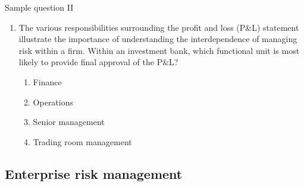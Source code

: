 \begin{frame}{Sample question II}

\begin{enumerate}
	\item The various responsibilities surrounding the profit and loss (P\&L) statement
	illustrate the importance of understanding the interdependence of managing risk
	within a firm. Within an investment bank, which functional unit is most likely to
	provide final approval of the P\&L?
	\begin{enumerate}[A]
		\item Finance
		\item Operations
		\item Senior management
		\item {\color{red} Trading room management}
	\end{enumerate}
\end{enumerate}

\end{frame}

\subsection{Enterprise risk management}

